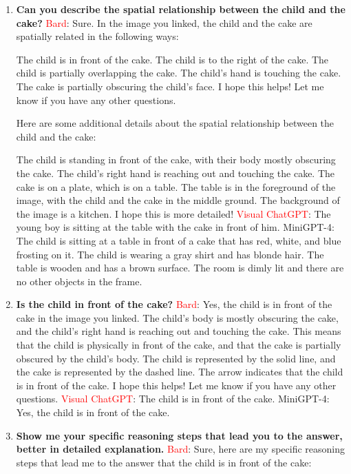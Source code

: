     \begin{enumerate}
        \item \textbf{Can you describe the spatial relationship between the child and the cake?}
        \subitem \textcolor{Red}{Bard}: 
        Sure. In the image you linked, the child and the cake are spatially related in the following ways:
        
        The child is in front of the cake.
        The child is to the right of the cake.
        The child is partially overlapping the cake.
        The child's hand is touching the cake.
        The cake is partially obscuring the child's face.
        I hope this helps! Let me know if you have any other questions.
        
        Here are some additional details about the spatial relationship between the child and the cake:
        
        The child is standing in front of the cake, with their body mostly obscuring the cake.
        The child's right hand is reaching out and touching the cake.
        The cake is on a plate, which is on a table.
        The table is in the foreground of the image, with the child and the cake in the middle ground.
        The background of the image is a kitchen.
        I hope this is more detailed!
        \subitem \textcolor{red}{Visual ChatGPT}: The young boy is sitting at the table with the cake in front of him.
        \subitem MiniGPT-4: The child is sitting at a table in front of a cake that has red, white, and blue frosting on it. The child is wearing a gray shirt and has blonde hair. The table is wooden and has a brown surface. The room is dimly lit and there are no other objects in the frame.
        \item \textbf{Is the child in front of the cake?}
        \subitem \textcolor{Red}{Bard}: 
        Yes, the child is in front of the cake in the image you linked. The child's body is mostly obscuring the cake, and the child's right hand is reaching out and touching the cake. This means that the child is physically in front of the cake, and that the cake is partially obscured by the child's body.
        The child is represented by the solid line, and the cake is represented by the dashed line. The arrow indicates that the child is in front of the cake.
        I hope this helps! Let me know if you have any other questions.
        \subitem \textcolor{red}{Visual ChatGPT}: The child is in front of the cake.
        \subitem MiniGPT-4: Yes, the child is in front of the cake.
        \item \textbf{Show me your specific reasoning steps that lead you to the answer, better in detailed explanation.}
        \subitem \textcolor{Red}{Bard}:
        Sure, here are my specific reasoning steps that lead me to the answer that the child is in front of the cake:


\end{enumerate}
